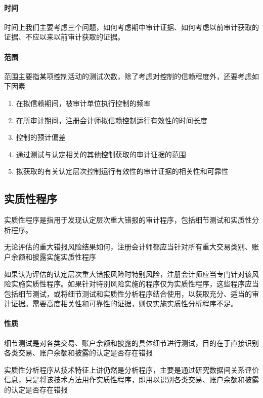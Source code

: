 \documentclass[UTF8,12pt]{ctexart}
\numberwithin{equation}{section} %
\numberwithin{figure}{section}
\numberwithin{table}{section}
\begin{document}
	\paragraph{时间}
	时间上我们主要考虑三个问题，如何考虑期中审计证据、如何考虑以前审计获取的证据、不应以来以前审计获取的证据。
	
	
	
	\paragraph{范围}
	范围主要指某项控制活动的测试次数，除了考虑对控制的信赖程度外，还要考虑如下因素
	\begin{enumerate}
		\item 在拟信赖期间，被审计单位执行控制的频率
		
		\item 在所审计期间，注册会计师拟信赖控制运行有效性的时间长度
		
		\item 控制的预计偏差
		
		\item 通过测试与认定相关的其他控制获取的审计证据的范围
		
		\item 拟获取的有关认定层次控制运行有效性的审计证据的相关性和可靠性
	\end{enumerate}
	
	\subsection{实质性程序}
	实质性程序是指用于发现认定层次重大错报的审计程序，包括细节测试和实质性分析程序。
	
	无论评估的重大错报风险结果如何，注册会计师都应当针对所有重大交易类别、账户余额和披露实施实质性程序
	
	如果认为评估的认定层次重大错报风险时特别风险，注册会计师应当专门针对该风险实施实质性程序。如果针对特别风险实施的程序仅为实质性程序，这些程序应当包括细节测试，或将细节测试和实质性分析程序结合使用，以获取充分、适当的审计证据。需要高度相关性和可靠性的证据，则仅实施实质性分析程序不足。
	
	\paragraph{性质}
	细节测试是对各类交易、账户余额和披露的具体细节进行测试，目的在于直接识别各类交易、账户余额和披露的认定是否存在错报
	
	实质性分析程序从技术特征上讲仍然是分析程序，主要是通过研究数据间关系评价信息，只是将该技术方法用作实质性程序，即用以识别各类交易、账户余额和披露的认定是否存在错报
	
\end{document}
